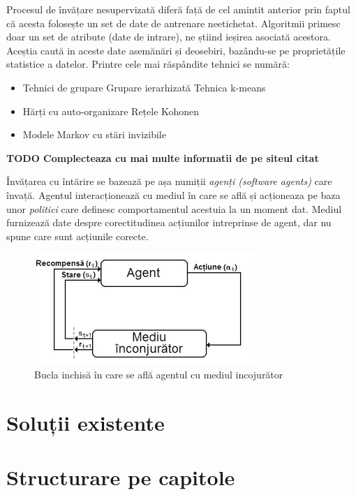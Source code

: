 Procesul de învățare nesupervizată diferă față de cel amintit anterior prin faptul că acesta folosește un set de date de antrenare neetichetat. Algoritmii primesc doar un set de atribute (date de intrare), ne știind ieșirea asociată acestora. Aceștia caută in aceste date asemănări și deosebiri, bazându-se pe proprietățile statistice a datelor. Printre cele mai răspândite tehnici se numără:
\begin{itemize}
	\item Tehnici de grupare
	\subitem Grupare ierarhizată
	\subitem Tehnica k-means
	\item Hărți cu auto-organizare
	\subitem Rețele Kohonen
	\item Modele Markov cu stări invizibile
\end{itemize}

\textbf{TODO Complecteaza cu mai multe informatii de pe siteul citat}

Învățarea cu întărire se bazează pe așa numiții \textit{agenți (software agents)} care învață. Agentul interacționează cu mediul în care se află și acționeaza pe baza unor \textit{politici} care definesc comportamentul acestuia la un moment dat. Mediul furnizează date despre corectitudinea acțiunilor intreprinse de agent, dar nu spune care sunt acțiunile corecte.\cite{site:reinf_intro}
\begin{figure}
	\center
	\includegraphics{fig/reinforcement_learning_feedback_loop.png}
	\caption{Bucla inchisă în care se află agentul cu mediul incojurător}
\end{figure}


\section{Soluții existente}

\section{Structurare pe capitole}